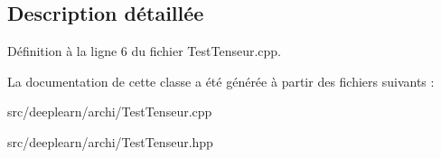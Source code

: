 \subsection{Description détaillée}


Définition à la ligne 6 du fichier Test\+Tenseur.\+cpp.



La documentation de cette classe a été générée à partir des fichiers suivants \+:\begin{DoxyCompactItemize}
\item 
src/deeplearn/archi/Test\+Tenseur.\+cpp\item 
src/deeplearn/archi/Test\+Tenseur.\+hpp\end{DoxyCompactItemize}
